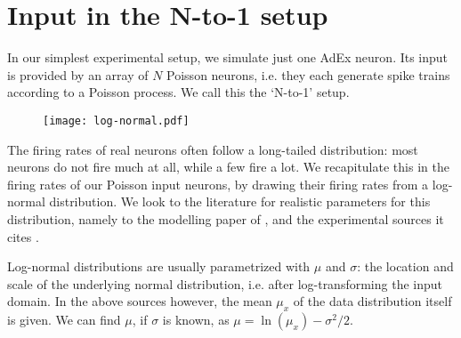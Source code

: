 \FloatBarrier
\section{Input in the N-to-1 setup}

In our simplest experimental setup, we simulate just one AdEx neuron.
Its input is provided by an array of $N$ Poisson neurons, i.e. they each generate spike trains according to a Poisson process. We call this the `N-to-1' setup.


\begin{figure}
    \hspace*{10em}
    \texttt{[image: log-normal.pdf]}
    \label{fig:log-normal}
\end{figure}

The firing rates of real neurons often follow a long-tailed distribution: most neurons do not fire much at all, while a few fire a lot. We recapitulate this in the firing rates of our Poisson input neurons, by drawing their firing rates from a log-normal distribution. We look to the literature for realistic parameters for this distribution, namely to the modelling paper of , and the experimental sources it cites \cite{Hromadka2008SparseRepresentationSounds,OConnor2010NeuralActivityBarrel}.

Log-normal distributions are usually parametrized with $μ$ and $σ$: the location and scale of the underlying normal distribution, i.e. after log-transforming the input domain. In the above sources however, the mean $μ_x$ of the data distribution itself is given. We can find $μ$, if $σ$ is known, as $μ = \ln(μ_x) - σ^2 / 2$.

